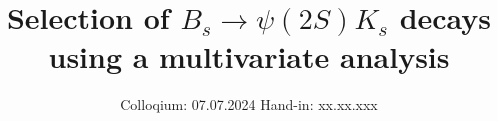 

\subject{V\_LHCbMVA}
\title{Selection of \texorpdfstring{$B_s \to \psi(2S)K_s$}{B_s -> Psi(2S)K_S} decays using a multivariate analysis}
\date{%
  Colloqium: 07.07.2024
  \hspace{3em}
  Hand-in: xx.xx.xxx
}
\newcommand{\signal}{$B_s \to \psi(2S)K_s$}

\usepackage{tikz}
\usepackage{tikz-feynman}
\usepackage{amsmath}




\maketitle
\thispagestyle{empty}
\tableofcontents
\newpage






\printbibliography{}



